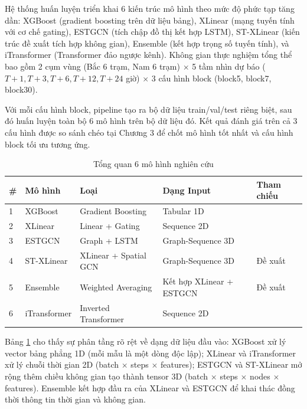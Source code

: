 Hệ thống huấn luyện triển khai 6 kiến trúc mô hình theo mức độ phức tạp tăng dần: XGBoost (gradient boosting trên dữ liệu bảng), XLinear (mạng tuyến tính với cơ chế gating), ESTGCN (tích chập đồ thị kết hợp LSTM), ST-XLinear (kiến trúc đề xuất tích hợp không gian), Ensemble (kết hợp trọng số tuyến tính), và iTransformer (Transformer đảo ngược kênh). Không gian thực nghiệm tổng thể bao gồm 2 cụm vùng (Bắc 6 trạm, Nam 6 trạm) $\times$ 5 tầm nhìn dự báo ($T+1, T+3, T+6, T+12, T+24$ giờ) $\times$ 3 cấu hình block (block5, block7, block30).

Với mỗi cấu hình block, pipeline tạo ra bộ dữ liệu train/val/test riêng biệt, sau đó huấn luyện toàn bộ 6 mô hình trên bộ dữ liệu đó. Kết quả đánh giá trên cả 3 cấu hình được so sánh chéo tại Chương 3 để chốt mô hình tốt nhất và cấu hình block tối ưu tương ứng.

\begin{table}[H]
    \centering
    \caption{Tổng quan 6 mô hình nghiên cứu}
    \label{tab:tong_quan_6_mo_hinh}
    \renewcommand{\arraystretch}{1.3}
    \begin{tabular}{p{0.8cm} p{2.5cm} p{3cm} p{4.5cm} p{2.5cm}}
    \toprule
    \textbf{\#} & \textbf{Mô hình} & \textbf{Loại} & \textbf{Dạng Input} & \textbf{Tham chiếu} \\
    \midrule
    1 & XGBoost & Gradient Boosting & Tabular 1D & \cite{Chen_2016} \\
    2 & XLinear & Linear + Gating & Sequence 2D & \cite{Chen_2026} \\
    3 & ESTGCN & Graph + LSTM & Graph-Sequence 3D & \cite{panja2025estgcn} \\
    4 & ST-XLinear & XLinear + Spatial GCN & Graph-Sequence 3D & Đề xuất \\
    5 & Ensemble & Weighted Averaging & Kết hợp XLinear + ESTGCN & Đề xuất \\
    6 & iTransformer & Inverted Transformer & Sequence 2D & \cite{liu2024itransformer} \\
    \bottomrule
    \end{tabular}
\end{table}


Bảng \ref{tab:tong_quan_6_mo_hinh} cho thấy sự phân tầng rõ rệt về dạng dữ liệu đầu vào: XGBoost xử lý vector bảng phẳng 1D (mỗi mẫu là một dòng độc lập); XLinear và iTransformer xử lý chuỗi thời gian 2D (batch $\times$ steps $\times$ features); ESTGCN và ST-XLinear mở rộng thêm chiều không gian tạo thành tensor 3D (batch $\times$ steps $\times$ nodes $\times$ features). Ensemble kết hợp đầu ra của XLinear và ESTGCN để khai thác đồng thời thông tin thời gian và không gian.

